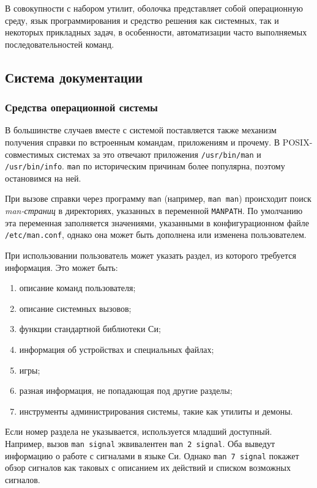 В совокупности с набором утилит, оболочка представляет собой операционную среду, язык программирования и средство решения как системных, так и некоторых прикладных задач, в особенности, автоматизации часто выполняемых последовательностей команд.

\subsection{Система документации}\label{base:os:structure:docs}
\subsubsection{Средства операционной системы}
В большинстве случаев вместе с системой поставляется также механизм получения справки по встроенным командам, приложениям и прочему. В POSIX-совместимых системах за это отвечают приложения \texttt{/usr/bin/man} и \texttt{/usr/bin/info}. \texttt{man} по историческим причинам более популярна, поэтому остановимся на ней.

При вызове справки через программу \texttt{man} (например, \texttt{man man}) происходит поиск \emph{man-страниц} в директориях, указанных в переменной \texttt{MANPATH}. По умолчанию эта переменная заполняется значениями, указанными в конфигурационном файле \texttt{/etc/man.conf}, однако она может быть дополнена или изменена пользователем.

При использовании пользователь может указать раздел, из которого требуется информация. Это может быть:
\begin{enumerate}
 \item описание команд пользователя;
 \item описание системных вызовов;
 \item функции стандартной библиотеки Си;
 \item информация об устройствах и специальных файлах;
 \item игры;
 \item разная информация, не попадающая под другие разделы;
 \item инструменты администрирования системы, такие как утилиты и демоны.
\end{enumerate}
Если номер раздела не указывается, используется младший доступный.
Например, вызов \texttt{man signal} эквивалентен \texttt{man 2 signal}. Оба выведут информацию о работе с сигналами в языке Си. Однако \texttt{man 7 signal} покажет обзор сигналов как таковых с описанием их действий и списком возможных сигналов.

